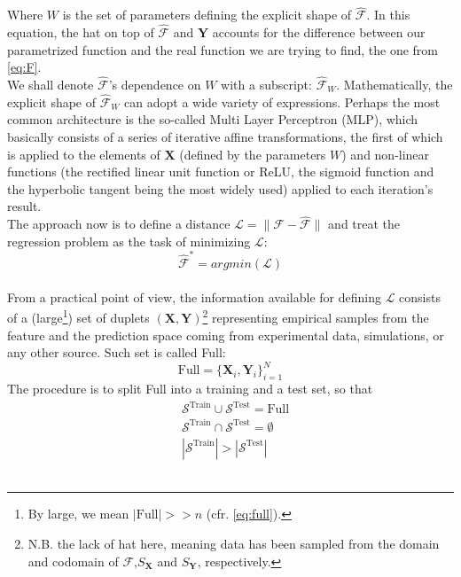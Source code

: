 Where $W$ is the set of parameters defining the explicit shape of $\mathcal{\hat{F}}$. In this equation, the hat on top of $\mathcal{\hat{F}}$ and $\mathbf{\hat{Y}}$ accounts for the difference between our parametrized function and the real function we are trying to find, the one from \cref{eq:F}.\\
%
\indent We shall denote $\mathcal{\hat{F}}$'s dependence on $W$ with a subscript: $\mathcal{\hat{F}}_W$. Mathematically, the explicit shape of $\mathcal{\hat{F}}_W$ can adopt a wide variety of expressions. Perhaps the most common architecture is the so-called Multi Layer Perceptron (MLP)\cite{Marsland2015Machine}, which basically consists of a series of iterative affine transformations, the first of which is applied to the elements of $\mathbf{X}$ (defined by the parameters $W$) and non-linear functions (the rectified linear unit function or ReLU, the sigmoid function and the hyperbolic tangent being the most widely used) applied to each iteration's result.\\
%
\indent The approach now is to define a distance $\mathcal{L}=\|\mathcal{F}-\mathcal{\hat{F}}\|$ and treat the regression problem as the task of minimizing $\mathcal{L}$:
\begin{equation}\label{eq:Fargmin}
	\mathcal{\hat{F}}^*=argmin(\mathcal{L})
\end{equation}\\
%
\indent From a practical point of view, the information available for defining $\mathcal{L}$ consists of a (large\footnote{By large, we mean $\left|\text{Full}\right|>>n$ (cfr. \cref{eq:full}).}) set of duplets $(\mathbf{X},\mathbf{Y})$\footnote{N.B. the lack of hat here, meaning data has been sampled from the domain and codomain of $\mathcal{F}$,$S_\mathbf{X}$ and $S_\mathbf{Y}$, respectively.} representing empirical samples from the feature and the prediction space coming from experimental data, simulations, or any other source. Such set is called Full:
\begin{equation}\label{eq:full}
	\text{Full}=\{\mathbf{X}_i,\mathbf{Y}_i\}_{i=1}^N
\end{equation}
The procedure is to split Full into a training and a test set, so that
\begin{align}
	& \mathcal{S}^\text{Train} \cup \mathcal{S}^\text{Test} = \text{Full} \\
	& \mathcal{S}^\text{Train} \cap \mathcal{S}^\text{Test} = \emptyset \\
	& |\mathcal{S}^\text{Train}| > |\mathcal{S}^\text{Test}|
\end{align}\\
